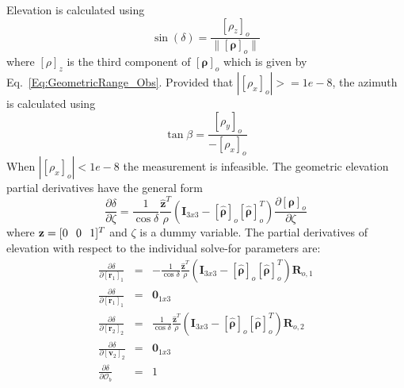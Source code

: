 Elevation is  calculated using
%
\begin{equation}
\sin(\delta) = \frac{ \left[ \rho_z \right]_o }{ \| \left[\boldsymbol{\rho}\right]_o \|}
\end{equation}
%
where $[\rho]_z$ is the third component of $[\boldsymbol{\rho}]_o$
which is given by Eq.~\ref{Eq:GeometricRange_Obs}. Provided that
$|[\rho_x]_o| >= 1e-8$, the azimuth is calculated using
%
\begin{equation}
\tan{\beta} = \frac{\left[ \rho_y \right]_o}{-\left[ \rho_x \right]_o}
\end{equation}
%
When $|[\rho_x]_o| < 1e-8$ the measurement is infeasible.
%
The geometric elevation partial derivatives have the general form
%
\begin{equation}
    \frac{\partial \delta}{\partial \zeta} = \frac{1}{\cos{\delta}}\frac{\hat{\mathbf{z}}^T}{\rho}
    \left(\mathbf{I}_{3x3} - \left[\hat{ \boldsymbol{\rho} }\right]_o
    \left[\hat{ \boldsymbol{\rho} }\right]_o^T  \right)\frac{\partial \left[\boldsymbol{\rho}\right]_o }{\partial \zeta}
\end{equation}
%
where $\mathbf{z} = [0 \hspace{.1 in} 0 \hspace{0.1 in} 1]^T$ and
$\zeta$ is a dummy variable.  The partial derivatives of elevation
with respect to the individual solve-for parameters are:
%
\begin{eqnarray}
    \frac{\partial \delta}{\partial \left[ \mathbf{r}_1 \right]_{1}} & = &
     -\frac{1}{\cos{\delta}}\frac{\hat{\mathbf{z}}^T}{\rho}
    \left(\mathbf{I}_{3x3} - \left[\hat{ \boldsymbol{\rho} }\right]_o
    \left[\hat{ \boldsymbol{\rho} }\right]_o^T  \right)\mathbf{R}_{o,1} \\
    \frac{\partial \delta}{\partial \left[ \dot{\mathbf{r}}_1 \right]_{1}} & = & \mathbf{0}_{1x3} \\
    \frac{\partial \delta}{\partial \left[ \mathbf{r}_2 \right]_{2}} & = &
    \frac{1}{\cos{\delta}}\frac{\hat{\mathbf{z}}^T}{\rho}
    \left(\mathbf{I}_{3x3} - \left[\hat{ \boldsymbol{\rho} }\right]_o
    \left[\hat{ \boldsymbol{\rho} }\right]_o^T  \right)\mathbf{R}_{o,2}\\
    \frac{\partial \delta}{\partial \left[ \mathbf{v}_2 \right]_{2}} & = & \mathbf{0}_{1x3}\\
    \frac{\partial \delta}{\partial  \mathcal{O}_b } & = & 1
\end{eqnarray}

